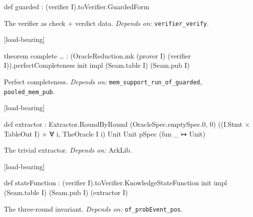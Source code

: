 \begin{leancode}
def guarded : (verifier I).toVerifier.GuardedForm
\end{leancode}


The verifier as check + verdict data. \emph{Depends on:} \texttt{verifier\_\allowbreak{}verify}.

\par\medskip\noindent\textbf{}\hfill\textsf{\small [load-bearing]}\par\nopagebreak

\begin{leancode}
theorem complete … : (OracleReduction.mk (prover I) (verifier I)).perfectCompleteness init impl (Seam.table I) (Seam.pub I)
\end{leancode}


Perfect completeness. \emph{Depends on:} \texttt{mem\_\allowbreak{}support\_\allowbreak{}run\_\allowbreak{}of\_\allowbreak{}guarded}, \texttt{pooled\_\allowbreak{}mem\_\allowbreak{}pub}.

\par\medskip\noindent\textbf{}\hfill\textsf{\small [load-bearing]}\par\nopagebreak

\begin{leancode}
def extractor : Extractor.RoundByRound (OracleSpec.emptySpec.{0, 0}) ((I.Stmt × TableOut I) × ∀ i, TheOracle I i) Unit Unit pSpec (fun _ ↦ Unit)
\end{leancode}


The trivial extractor. \emph{Depends on:} ArkLib.

\par\medskip\noindent\textbf{}\hfill\textsf{\small [load-bearing]}\par\nopagebreak

\begin{leancode}
def stateFunction : (verifier I).toVerifier.KnowledgeStateFunction init impl (Seam.table I) (Seam.pub I) (extractor I)
\end{leancode}


The three-round invariant. \emph{Depends on:} \texttt{of\_\allowbreak{}probEvent\_\allowbreak{}pos}.

